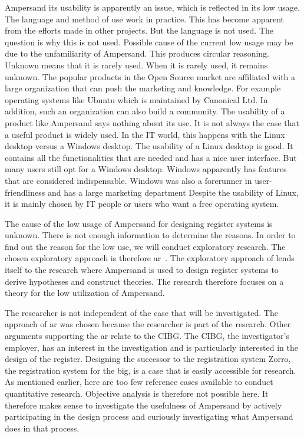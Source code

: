 Ampersand its usability is apparently an issue, which is reflected in its low usage.
The language and method of use work in practice. This has become apparent from the efforts made in other projects.
But the language is not used.
The question is why this is not used.
Possible cause of the current low usage may be due to the unfamiliarity of Ampersand.
This produces circular reasoning.
Unknown means that it is rarely used.
When it is rarely used, it remains unknown.
The popular products in the Open Source market are affiliated with a large organization that can push the marketing and knowledge. 
For example operating systems like Ubuntu which is maintained by Canonical Ltd.
In addition, such an organization can also build a community.
The usability of a product like Ampersand says nothing about its use.
It is not always the case that a useful product is widely used.
In the IT world, this happens with the Linux desktop versus a Windows desktop.
The usability of a Linux desktop is good.
It contains all the functionalities that are needed and has a nice user interface.
But many users still opt for a Windows desktop.
Windows apparently has features that are considered indispensable.
Windows was also a forerunner in user-friendliness and has a large marketing department
Despite the usability of Linux, it is mainly chosen by IT people or users who want a free operating system.

The cause of the low usage of Ampersand for designing register systems is unknown.
There is not enough information to determine the reasons.
In order to find out the reason for the low use, we will conduct exploratory research.
The chosen exploratory approach is therefore \acrfull{ar}~\citep{Easterbrook}.
The exploratory approach of \cite{Easterbrook} lends itself to the research where Ampersand is used to design register systems to derive hypotheses and construct theories.
The research therefore focuses on a theory for the low utilization of Ampersand.

The researcher is not independent of the case that will be investigated.
The approach of \acrshort{ar} was chosen because the researcher is part of the research.
Other arguments supporting the \acrshort{ar} relate to the CIBG.
The CIBG, the investigator's employer, has an interest in the investigation and is particularly interested in the design of the register.
Designing the successor to the registration system Zorro, the registration system for the \acrshort{big}, is a case that is easily accessible for research.
As mentioned earlier, here are too few reference cases available to conduct quantitative research.
Objective analysis is therefore not possible here.
It therefore makes sense to investigate the usefulness of Ampersand by actively participating in the design process and curiously investigating what Ampersand does in that process.

